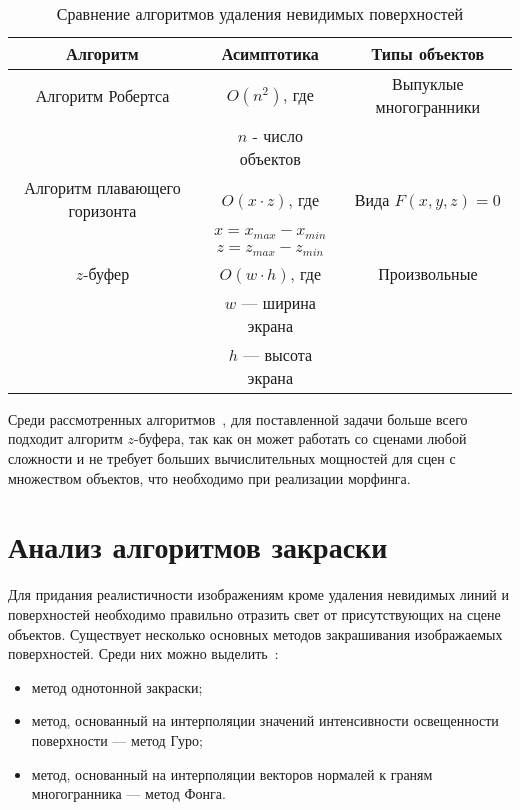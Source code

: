 \begin{table}[ht]
	\small
	\begin{center}
		\begin{threeparttable}
			\caption{Сравнение алгоритмов удаления невидимых поверхностей}
			\label{tbl:test_rem_faces}
			\begin{tabular}{|c|c|c|}
				\hline
				\bfseries Алгоритм & \bfseries Асимптотика & \bfseries Типы объектов \\
				\hline
				Алгоритм Робертса & $O(n^2)$, где & Выпуклые многогранники \\
				& $n$ - число объектов & \\
				\hline
				Алгоритм плавающего горизонта & $O(x \cdot z)$, где & Вида $F(x, y, z) = 0$ \\
				& $x = x_{max} - x_{min}$ & \\
				& $z = z_{max} - z_{min}$ & \\
				\hline
				$z$-буфер & $O(w \cdot h)$, где & Произвольные \\
				& $w$ --- ширина экрана & \\
				& $h$ --- высота экрана & \\
				\hline
			\end{tabular}
		\end{threeparttable}
	\end{center}
\end{table}

\leavevmode

Среди рассмотренных алгоритмов~\cite{REMOVE_FACES, ZBuff}, для поставленной задачи больше всего подходит алгоритм $z$-буфера, так как он может работать со сценами любой сложности и не требует больших вычислительных мощностей для сцен с множеством объектов, что необходимо при реализации морфинга.


\section{Анализ алгоритмов закраски}

Для придания реалистичности изображениям кроме удаления невидимых линий и поверхностей необходимо правильно отразить свет от присутствующих на сцене объектов. Существует несколько основных методов закрашивания изображаемых поверхностей. Среди них можно выделить~\cite{FILL_FACES}:

\begin{itemize}[label*=---]
	\item метод однотонной закраски;
	\item метод, основанный на интерполяции значений интенсивности освещенности поверхности --- метод Гуро;
	\item метод, основанный на интерполяции векторов нормалей к граням многогранника --- метод Фонга.
\end{itemize}

